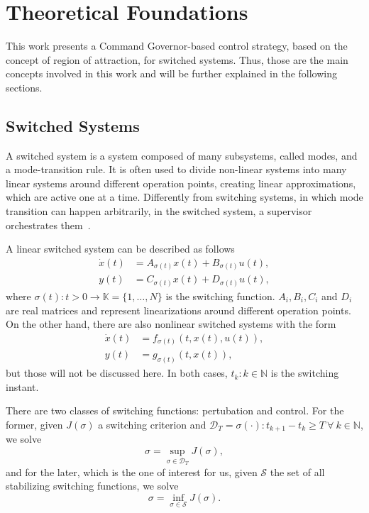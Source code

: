 
\chapter{Theoretical Foundations}%
\label{chp:theoretical-foundations}

This work presents a Command Governor-based control strategy, based on the concept of region of attraction, for switched systems. Thus, those are the main concepts involved in this work and
will be further explained in the following sections.

\section{Switched Systems}%
\label{sec:switched-systems}

A switched system is a system composed of many subsystems, called modes, and a mode-transition rule. It is often used to divide non-linear systems into many linear systems around different operation points, creating linear
approximations, which are active one at a time. Differently from
switching systems, in which mode transition can happen arbitrarily, in
the switched system, a supervisor orchestrates
them~\parencite{lucia.franzè:stabilization,liberzon.morse:basic}.

A linear switched system can be described as follows
%
\begin{align}
  \dot{x}(t) & = A_{\sigma(t)}x(t) + B_{\sigma(t)}u(t), \\
  y(t)       & = C_{\sigma(t)}x(t) + D_{\sigma(t)}u(t),
\end{align}
%
where \(\sigma(t):t>0\rightarrow\mathbb{K}=\{1,\ldots,N\}\) is the switching function.
\(A_{i}, B_{i}, C_{i}\) and \(D_{i}\) are real matrices and represent
linearizations around different operation points. On the other hand, there are also nonlinear
switched systems with the form
%
\begin{align}
  \dot{x}(t) & = f_{\sigma(t)}(t,x(t),u(t)), \\
  y(t)       & = g_{\sigma(t)}(t,x(t)),
\end{align}
%
but those will not be discussed here. In both cases, \(t_{k}:k\in\mathbb{N}\) is
the switching instant.

There are two classes of switching functions: pertubation and control. For the
former, given \(J(\sigma)\) a switching criterion and
\(\mathcal{D}_{T}=\sigma(\cdot):t_{k+1}-t_{k}\ge{}T~\forall{}~k\in{}\mathbb{N}\), we solve
%
\begin{equation}
  \sigma = \sup_{\sigma\in\mathcal{D}_{T}} J(\sigma),
\end{equation}
%
and for the later, which is the one of interest for us, given \(\mathcal{S}\)
the set of all stabilizing switching functions, we solve
%
\begin{equation}
  \sigma = \inf_{\sigma\in\mathcal{S}} J(\sigma).
\end{equation}


